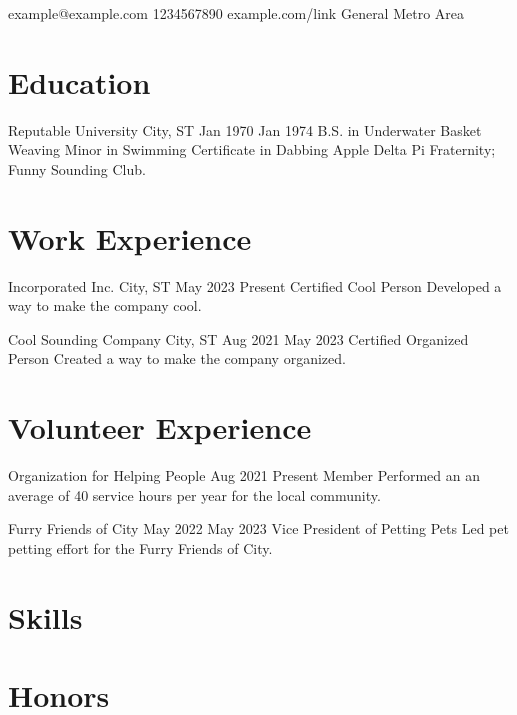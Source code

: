 \documentclass{resume}
\begin{document}
\contact
    {example@example.com} %
    {1234567890} %
    {example.com/link} %
    {General Metro Area} %

\section{Education}
\education
    {Reputable University} %
    {City, ST} %
    {Jan 1970} %
    {Jan 1974} %
    {B.S. in Underwater Basket Weaving} %
    {Minor in Swimming} %
    {Certificate in Dabbing} %
    {Apple Delta Pi Fraternity; Funny Sounding Club.} %

\section{Work Experience}
\work
    {Incorporated Inc.} %
    {City, ST} %
    {May 2023} %
    {Present} %
    {Certified Cool Person} %
    { %
        \newitem Developed a way to make the company cool.
    }

\work
    {Cool Sounding Company}
    {City, ST}
    {Aug 2021}
    {May 2023}
    {Certified Organized Person}
    {
        \newitem Created a way to make the company organized.
    }

\section{Volunteer Experience}
\volunteer
    {Organization for Helping People} %
    {Aug 2021} %
    {Present} %
    {Member} %
    { %
        \newitem Performed an an average of 40 service hours per year for the local community.
    }

\volunteer
    {Furry Friends of City}
    {May 2022}
    {May 2023}
    {Vice President of Petting Pets}
    {
        \newitem Led pet petting effort for the Furry Friends of City.
    }

\section{Skills}

\section{Honors}
\end{document}
